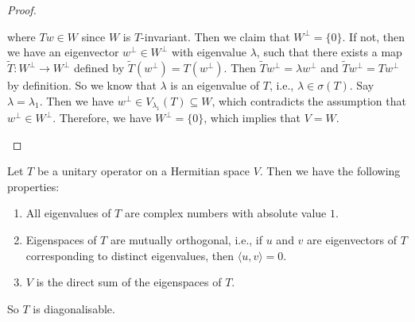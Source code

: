 \begin{proof}
\begin{enumerate}[label = (\arabic*)]
\[		      \]
		      where $T w \in W$ since $W$ is $T$-invariant. Then we claim that $W^\perp = \{ 0 \}$. If not, then we have an eigenvector $w^\perp \in W^\perp$ with eigenvalue $\lambda$, such that there exists a map $\widetilde{T} : W^\perp \to W^\perp$ defined by $\widetilde{T}(w^\perp) = T(w^\perp)$. Then $\widetilde{T} w^\perp = \lambda w^\perp$ and $\widetilde{T} w^\perp = T w^\perp$ by definition. So we know that $\lambda$ is an eigenvalue of $T$, i.e., $\lambda \in \sigma(T)$. Say $\lambda = \lambda_1$. Then we have $w^\perp \in V_{\lambda_1} (T) \subseteq W$, which contradicts the assumption that $w^\perp \in W^\perp$. Therefore, we have $W^\perp = \{ 0 \}$, which implies that $V = W$. \qedhere
	\end{enumerate}
\end{proof}

\begin{proposition}
	Let $T$ be a unitary operator on a Hermitian space $V$. Then we have the following properties:
	\begin{enumerate}
		\item All eigenvalues of $T$ are complex numbers with absolute value $1$.
		\item Eigenspaces of $T$ are mutually orthogonal, i.e., if $u$ and $v$ are eigenvectors of $T$ corresponding to distinct eigenvalues, then $\langle u, v \rangle = 0$.
		\item $V$ is the direct sum of the eigenspaces of $T$.
	\end{enumerate}
	So $T$ is diagonalisable.
\end{proposition}
